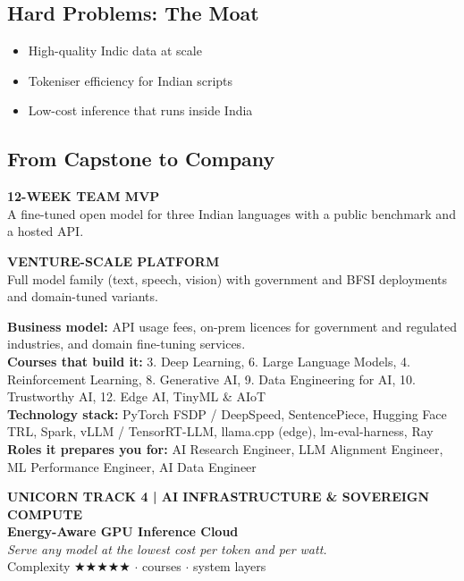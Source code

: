 \documentclass[10pt,a4paper]{article}
\begin{document}
\subsection*{Hard Problems: The Moat}\begin{itemize}\small
\item High-quality Indic data at scale
\item Tokeniser efficiency for Indian scripts
\item Low-cost inference that runs inside India
\end{itemize}
\subsection*{From Capstone to Company}
\begin{tcbraster}[raster columns=2,raster equal height,raster column skip=8pt]\begin{tcolorbox}[colback=l1bg,colframe=l1bg,arc=2pt,borderline north={2.5pt}{0pt}{saffron}]{\scriptsize\bfseries\color{muted}12-WEEK TEAM MVP}\\\small A fine-tuned open model for three Indian languages with a public benchmark and a hosted API.\end{tcolorbox}\begin{tcolorbox}[colback=l3bg,colframe=l3bg,arc=2pt,borderline north={2.5pt}{0pt}{igreen}]{\scriptsize\bfseries\color{muted}VENTURE-SCALE PLATFORM}\\\small Full model family (text, speech, vision) with government and BFSI deployments and domain-tuned variants.\end{tcolorbox}\end{tcbraster}
{\small\textbf{Business model:} API usage fees, on-prem licences for government and regulated industries, and domain fine-tuning services.\\\textbf{Courses that build it:} 3. Deep Learning, 6. Large Language Models, 4. Reinforcement Learning, 8. Generative AI, 9. Data Engineering for AI, 10. Trustworthy AI, 12. Edge AI, TinyML \& AIoT\\\textbf{Technology stack:} PyTorch FSDP / DeepSpeed, SentencePiece, Hugging Face TRL, Spark, vLLM / TensorRT-LLM, llama.cpp (edge), lm-eval-harness, Ray\\\textbf{Roles it prepares you for:} AI Research Engineer, LLM Alignment Engineer, ML Performance Engineer, AI Data Engineer}
\newpage
\begin{tcolorbox}[colback=navy,colframe=navy,arc=2pt,left=8pt,top=5pt,bottom=5pt]{\small\bfseries\color{goldl}UNICORN TRACK 4 \;|\; AI INFRASTRUCTURE \& SOVEREIGN COMPUTE}\\[1pt]{\LARGE\bfseries\color{white}Energy-Aware GPU Inference Cloud}\\[2pt]{\small\itshape\color{goldl}Serve any model at the lowest cost per token and per watt.}\\[2pt]{\small\color{white}Complexity {\color{goldl}★★★★★} \;$\cdot$ courses \;$\cdot$ system layers}\end{tcolorbox}
\end{document}
